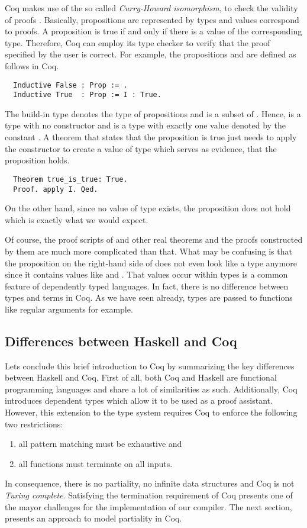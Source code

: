 Coq makes use of the so called \textit{Curry-Howard isomorphism}, to check the validity of proofs \cite[p.~1]{CoqDevTeam:2018}.
Basically, propositions are represented by types and values correspond to proofs.
A proposition is true if and only if there is a value of the corresponding type.
Therefore, Coq can employ its type checker to verify that the proof specified by the user is correct.
For example, the propositions  and  are defined as follows in Coq.
\begin{verbatim}
  Inductive False : Prop := .
  Inductive True  : Prop := I : True.
\end{verbatim}
The build-in type  denotes the type of propositions and is a subset of .
Hence,  is a type with no constructor and  is a type with exactly one value denoted by the constant .
A theorem that states that the proposition  is true just needs to apply the constructor  to create a value of type  which serves as evidence, that the proposition holds.
\begin{verbatim}
  Theorem true_is_true: True.
  Proof. apply I. Qed.
\end{verbatim}
On the other hand, since no value of type  exists, the proposition  does not hold which is exactly what we would expect.

Of course, the proof scripts of  and other real theorems and the proofs constructed by them are much more complicated than that.
What may be confusing is that the proposition on the right-hand side of  does not even look like a type anymore since it contains values like  and .
That values occur within types is a common feature of dependently typed languages.
In fact, there is no difference between types and terms in Coq.
As we have seen already, types are passed to functions like regular arguments for example.

\subsection{Differences between Haskell and Coq} \label{sec:preliminaries:coq:summary}
Lets conclude this brief introduction to Coq by summarizing the key differences between Haskell and Coq.
First of all, both Coq and Haskell are functional programming languages and share a lot of similarities as such.
Additionally, Coq introduces dependent types which allow it to be used as a proof assistant.
However, this extension to the type system requires Coq to enforce the following two restrictions:
\begin{enumerate}
  \item all pattern matching must be exhaustive and
  \item all functions must terminate on all inputs.
\end{enumerate}
In consequence, there is no partiality, no infinite data structures and Coq is not \textit{Turing complete}.
Satisfying the termination requirement of Coq presents one of the mayor challenges for the implementation of our compiler.
The next section, presents an approach to model partiality in Coq.
